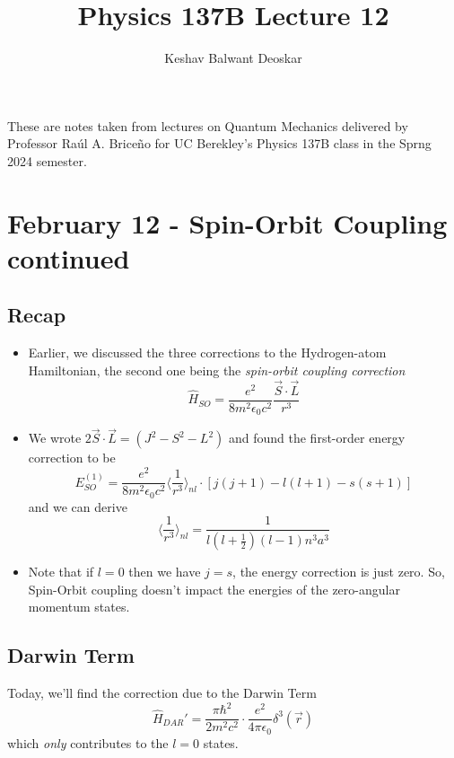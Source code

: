 \documentclass{article}
\title{Physics 137B Lecture 12}
\author{Keshav Balwant Deoskar}
\newcommand{\mean}[1]{\langle #1 \rangle}
\begin{document}
\maketitle

These are notes taken from lectures on Quantum Mechanics delivered by Professor Raúl A. Briceño for UC Berekley's Physics 137B class in the Sprng 2024 semester.

\tableofcontents

\pagebreak

\section{February 12 - Spin-Orbit Coupling continued}

\vskip 1cm

\subsection*{Recap}
\begin{itemize}
  \item Earlier, we discussed the three corrections to the Hydrogen-atom Hamiltonian, the second one being the \emph{spin-orbit coupling correction}
  \[ \hat{H}_{SO} = \frac{e^2}{8m^2 \epsilon_0 c^2} \frac{\vec{S} \cdot \vec{L}}{r^3} \]
  
  \item We wrote $2 \vec{S} \cdot \vec{L} = \left( J^2 - S^2 - L^2 \right)$ and found the first-order energy correction to be 
  \[ E_{SO}^{(1)} = \frac{e^2}{8m^2 \epsilon_0 c^2} \mean{\frac{1}{r^3}}_{nl} \cdot \left[ j(j+1) - l(l+1) -s(s+1) \right] \]
  and we can derive 
  \[ \mean{\frac{1}{r^3}}_{nl} = \frac{1}{l(l + \frac{1}{2})(l - 1)n^3 a^3} \]

  \item Note that if $l = 0$ then we have $j = s$, the energy correction is just zero. So, Spin-Orbit coupling doesn't impact the energies of the zero-angular momentum states.
\end{itemize}

\vskip 1cm
\subsection{Darwin Term}

\vskip 0.5cm
Today, we'll find the correction due to the Darwin Term
\[ \hat{H}_{DAR}' = \frac{\pi \hbar^2}{2m^2 c^2} \cdot \frac{e^2}{4\pi \epsilon_0} \delta^3(\vec{r}) \]
which \emph{only} contributes to the $l = 0$ states.
\end{document}
